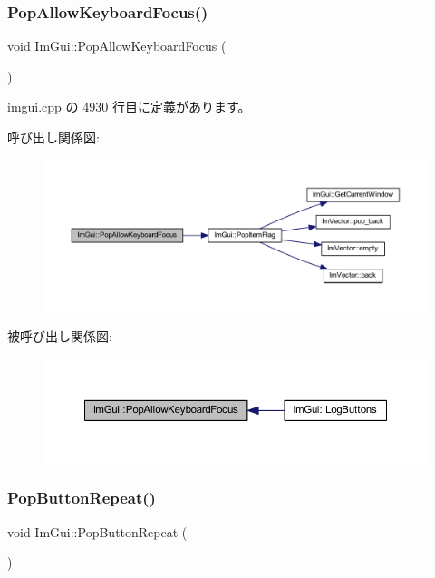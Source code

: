 \subsubsection{\texorpdfstring{Pop\+Allow\+Keyboard\+Focus()}{PopAllowKeyboardFocus()}}
{\footnotesize\ttfamily void Im\+Gui\+::\+Pop\+Allow\+Keyboard\+Focus (\begin{DoxyParamCaption}{ }\end{DoxyParamCaption})}



 imgui.\+cpp の 4930 行目に定義があります。

呼び出し関係図\+:\nopagebreak
\begin{figure}[H]
\begin{center}
\leavevmode
\includegraphics[width=350pt]{namespace_im_gui_a017db69016de97685aec978e504dc96d_cgraph}
\end{center}
\end{figure}
被呼び出し関係図\+:\nopagebreak
\begin{figure}[H]
\begin{center}
\leavevmode
\includegraphics[width=350pt]{namespace_im_gui_a017db69016de97685aec978e504dc96d_icgraph}
\end{center}
\end{figure}
\mbox{\label{namespace_im_gui_a0f883e8507be797ca8ba1448d2b9dbb0}} 
\subsubsection{\texorpdfstring{Pop\+Button\+Repeat()}{PopButtonRepeat()}}
{\footnotesize\ttfamily void Im\+Gui\+::\+Pop\+Button\+Repeat (\begin{DoxyParamCaption}{ }\end{DoxyParamCaption})}



